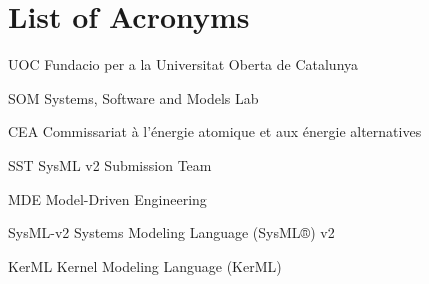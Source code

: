 \section*{List of Acronyms}
\begin{descriptioncompact}
    \item[UOC] {Fundacio per a la Universitat Oberta de Catalunya}
    \item[SOM] {Systems, Software and Models Lab}
    \item[CEA] {Commissariat à l'énergie atomique et aux énergie alternatives}
    \item[SST] {SysML v2 Submission Team}
    \item
    \item[MDE] {Model-Driven Engineering}
    \item[SysML-v2] {Systems Modeling Language (SysML®) v2}
    \item[KerML] {Kernel Modeling Language (KerML)}
\end{descriptioncompact}
